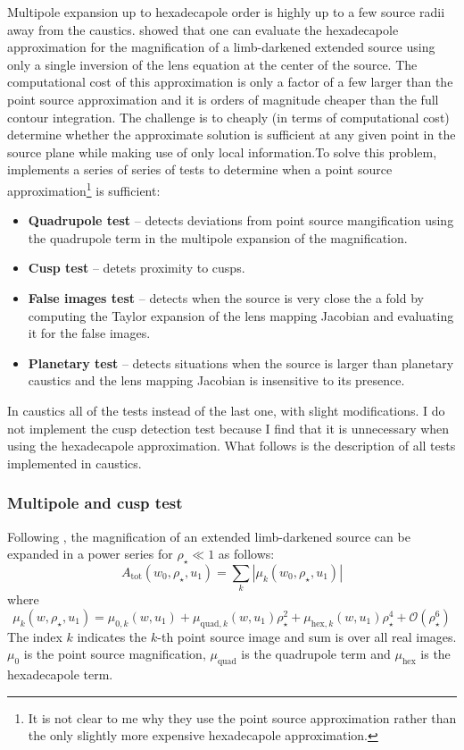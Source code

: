 \documentclass[12pt,dvipsnames]{report}
\newcommand{\ssf}[1]{\textsf{#1}}
\begin{document}
Multipole expansion up to hexadecapole order \citep{2008ApJ...681.1593G,2017MNRAS.468.3993C}
is highly up to a few source radii away from the caustics. \citep{2017MNRAS.468.3993C} showed
that one can evaluate the hexadecapole approximation for the magnification of a limb-darkened 
extended source using only a single inversion of the lens equation at the center of the 
source. The computational cost of this approximation is only a factor of a few larger than 
the point source approximation and it is orders of magnitude cheaper than the full contour
integration.
The challenge is to cheaply (in terms of computational cost) determine whether the approximate 
solution is sufficient at any given point in the source plane while making use of only 
local information.To solve this problem, \citep{2018MNRAS.479.5157B} implements a series of  
series of tests to determine when a point source approximation\footnote{It is not clear to me why 
they use the point source approximation rather than the only slightly more expensive 
hexadecapole approximation.} is sufficient:
\begin{itemize}
    \item \textbf{Quadrupole test} -- detects deviations from point source mangification using 
    the quadrupole term in the multipole expansion of the magnification.
    \item \textbf{Cusp test} -- detets proximity to cusps.
    \item \textbf{False images test} -- detects when the source is very close the a fold by computing the 
    Taylor expansion of the lens mapping Jacobian and evaluating it for the false images.
    \item \textbf{Planetary test} -- detects situations when the source is larger than 
    planetary caustics and the lens mapping Jacobian is insensitive to its presence.
\end{itemize}
In \ssf{caustics} all of the tests instead of the last one, with slight modifications. 
I do not implement the cusp detection test because I find that it is unnecessary when using 
the hexadecapole approximation. What follows is the description of all tests implemented in 
\ssf{caustics}.

\subsubsection{Multipole and cusp test}
Following \citet{2017MNRAS.468.3993C}, the magnification of an extended limb-darkened source 
can be expanded in a power series for $\rho_\star\ll 1$ as follows:
\begin{equation}
    A_\mathrm{tot}(w_0,\rho_\star,u_1)=\sum_{k}|\mu_k(w_0,\rho_\star,u_1)|
\end{equation}
where 
\begin{equation}
\mu_k(w,\rho_\star,u_1)=\mu_{0,k}(w,u_1) + \mu_{\mathrm{quad},k}(w,u_1)\rho_\star^2 + 
    \mu_{\mathrm{hex},k}(w,u_1)\rho_\star^4+\mathcal{O}(\rho_\star^6)
\end{equation}
The index $k$ indicates the $k$-th point source image and sum is over all real images.
$\mu_0$ is the point source magnification, $\mu_\mathrm{quad}$ is the quadrupole term 
and $\mu_\mathrm{hex}$ is the hexadecapole term. 
\end{document}
